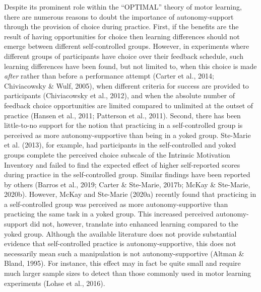 \documentclass[
  english,
  jou]{apa7}
\begin{document}
Despite its prominent role within the ``OPTIMAL'' theory of motor learning, there are numerous reasons to doubt the importance of autonomy-support through the provision of choice during practice. First, if the benefits are the result of having opportunities for choice then learning differences should not emerge between different self-controlled groups. However, in experiments where different groups of participants have choice over their feedback schedule, such learning differences have been found, but not limited to, when this choice is made \emph{after} rather than before a performance attempt (Carter et al., 2014; Chiviacowsky \& Wulf, 2005), when different criteria for success are provided to participants (Chiviacowsky et al., 2012), and when the absolute number of feedback choice opportunities are limited compared to unlimited at the outset of practice (Hansen et al., 2011; Patterson et al., 2011). Second, there has been little-to-no support for the notion that practicing in a self-controlled group is perceived as more autonomy-supportive than being in a yoked group. Ste-Marie et al. (2013), for example, had participants in the self-controlled and yoked groups complete the perceived choice subscale of the Intrinsic Motivation Inventory and failed to find the expected effect of higher self-reported scores during practice in the self-controlled group. Similar findings have been reported by others (Barros et al., 2019; Carter \& Ste-Marie, 2017b; McKay \& Ste-Marie, 2020b). However, McKay and Ste-Marie (2020a) recently found that practicing in a self-controlled group was perceived as more autonomy-supportive than practicing the same task in a yoked group. This increased perceived autonomy-support did not, however, translate into enhanced learning compared to the yoked group. Although the available literature does not provide substantial evidence that self-controlled practice is autonomy-supportive, this does not necessarily mean such a manipulation is not autonomy-supportive (Altman \& Bland, 1995). For instance, this effect may in fact be quite small and require much larger sample sizes to detect than those commonly used in motor learning experiments (Lohse et al., 2016).
\end{document}
